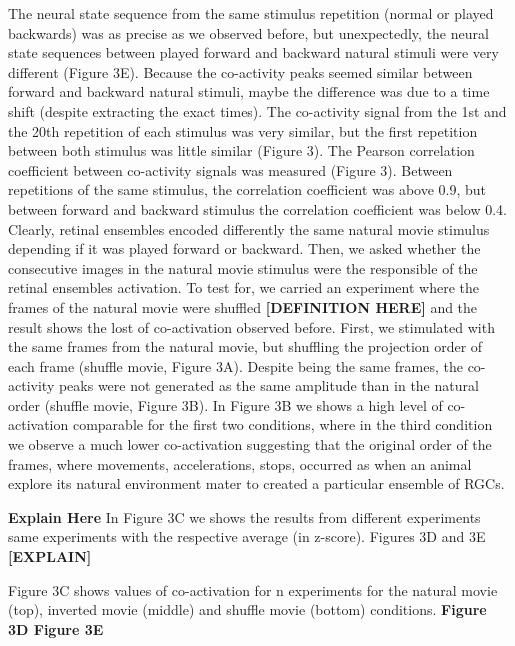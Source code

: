 \documentclass[9pt,twocolumn,twoside,lineno]{pnas-new}
\begin{document}
The neural state sequence from the same stimulus repetition (normal or played backwards) was as precise as we observed before, but unexpectedly, the neural state sequences between played forward and backward natural stimuli were very different (Figure 3E). Because the co-activity peaks seemed similar between forward and backward natural stimuli, maybe the difference was due to a time shift (despite extracting the exact times). The co-activity signal from the 1st and the 20th repetition of each stimulus was very similar, but the first repetition between both stimulus was little similar (Figure 3). The Pearson correlation coefficient between co-activity signals was measured (Figure 3). Between repetitions of the same stimulus, the correlation coefficient was above 0.9, but between forward and backward stimulus the correlation coefficient was below 0.4. Clearly, retinal ensembles encoded differently the same natural movie stimulus depending if it was played forward or backward. 
Then, we asked whether the consecutive images in the natural movie stimulus were the responsible of the retinal ensembles activation. To test for, we carried an experiment where the frames of the natural movie were shuffled \textbf{[DEFINITION HERE]} and the result shows the lost of co-activation observed before. First, we stimulated with the same frames from the natural movie, but shuffling the projection order of each frame (shuffle movie, Figure 3A). Despite being the same frames, the co-activity peaks were not generated as the same amplitude than in the natural order (shuffle movie, Figure 3B).
In Figure 3B we shows a high level of co-activation comparable for the first two conditions, where in the third condition we observe a much lower co-activation suggesting that the original order of the frames, where  movements, accelerations, stops, occurred as when an animal explore its natural environment mater to created a particular ensemble of RGCs. 

\textbf{Explain Here}
In Figure 3C we shows the results from different experiments same experiments with the respective average (in z-score). Figures 3D and 3E \textbf{[EXPLAIN]}

Figure 3C shows values of co-activation for n experiments for the natural movie (top), inverted movie (middle) and shuffle movie (bottom) conditions. \textbf{Figure 3D Figure 3E}
\end{document}

